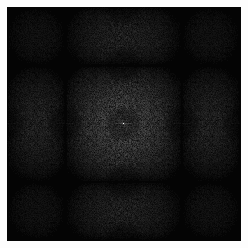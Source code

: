 \begin{figure}[H]
\begin{tcolorbox}[boxrule=4pt,sharp corners=downhill,title=Retargeting]
\begin{subfigure}[b]{0.2\textwidth}
        \label{pic:sorting_retarget_t5}
    \end{subfigure}
    \begin{subfigure}[b]{0.2\textwidth}
        \centering
        \includegraphics[width=\textwidth]{content/TemporalerAlg/Bilder/Retargeting/Spektren/Ausschnitt5.png}
        \label{pic:sorting_t5_retarget_FFT}
    \end{subfigure}
    \begin{subfigure}[b]{0.2\textwidth}
        \centering

\end{subfigure}
\end{tcolorbox}
\end{figure}
